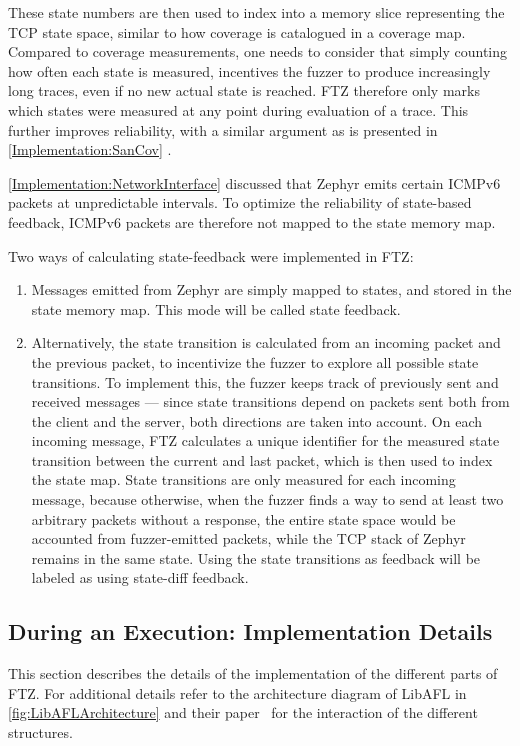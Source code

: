 \documentclass[twocolumn]{article}
\newcommand{\proj}{FTZ\xspace}
\let\savedCite=\cite
\renewcommand{\cite}{\unskip~\savedCite}
\begin{document}
These state numbers are then used to index into a memory slice representing the TCP state space, similar to how coverage is catalogued in a coverage map. Compared to coverage measurements, one needs to consider that simply counting how often each state is measured, incentives the fuzzer to produce increasingly long traces, even if no new actual state is reached. \proj therefore only marks which states were measured at any point during evaluation of a trace. This further improves reliability, with a similar argument as is presented in \cref{Implementation:SanCov} .

\cref{Implementation:NetworkInterface} discussed that Zephyr emits certain ICMPv6 packets at unpredictable intervals. To optimize the reliability of state-based feedback, ICMPv6 packets are therefore not mapped to the state memory map.

Two ways of calculating state-feedback were implemented in \proj :
\begin{enumerate}
  \item Messages emitted from Zephyr are simply mapped to states, and stored in the state memory map. This mode will be called state feedback.
  \item Alternatively, the state transition is calculated from an incoming packet and the previous packet, to incentivize the fuzzer to explore all possible state transitions. To implement this, the fuzzer keeps track of previously sent and received messages — since state transitions depend on packets sent both from the client and the server, both directions are taken into account. On each incoming message, \proj calculates a unique identifier for the measured state transition between the current and last packet, which is then used to index the state map. State transitions are only measured for each incoming message, because otherwise, when the fuzzer finds a way to send at least two arbitrary packets without a response, the entire state space would be accounted from fuzzer-emitted packets, while the TCP stack of Zephyr remains in the same state. Using the state transitions as feedback will be labeled as using state-diff feedback.
\end{enumerate}

\subsection{During an Execution: Implementation Details}
\label{Implementation:ImplementationDetails}

This section describes the details of the implementation of the different parts of \proj. For additional details refer to the architecture diagram of LibAFL in \cref{fig:LibAFLArchitecture} and their paper\cite{LibAFL} for the interaction of the different structures.
\end{document}
